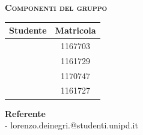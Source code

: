 {\begin{titlepage}
\begin{center}
      \vspace{10pt} 
      
     \begin{center}
     	\textbf{\textsc{Componenti del gruppo}}\\ \bigskip
		\begin{tabular}{ l | c }
				\textbf{Studente}	& \textbf{Matricola} \\ \hline 
		 		\fiamma 					& 1167703 \\ 
		 		\ludo 						& 1161729 \\ 
		 		\perin 						& 1170747\\ 
				\toffo						& 1161727 \\
			\end{tabular}
			\vspace{0.5cm}
		\end{center}

		\vspace*{\fill}
			
		\begin{center}
			\textbf{Referente\\}
			\ludo - lorenzo.deinegri.@studenti.unipd.it\\
		\end{center}
			
		\end{center}
	\end{titlepage}
\pagebreak
}

